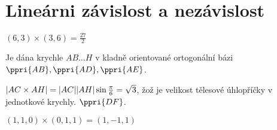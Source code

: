 
\let\braceru=\relax \let\bracelu=\relax 
\def\o#1{\setbox0=
	\hbox{$\kern2pt\overbrace{\kern-2pt#1\kern-2pt}\kern2pt$}\ht0=2.1ex\box0}
\def\to#1{\hbox{#1\rlap{\t{}}}}
\def\rad{\rm{rad}}
\def\f{\frac}
\BeginDoc{}
\section{Lineárni závislost a nezávislost}

$(6,3)\times (3,6) = \f{27}2$


Je dána krychle $AB\dots H$ v kladně orientované ortogonální bázi $\ppri{AB}, \ppri{AD}, \ppri{AE}$.

$|AC\times AH|=|AC|\*|AH|\* \sin \f\pi6 = \sqrt{3}$, žož je velikost tělesové úhlopříčky v jednotkové krychly.
$\ppri{DF}$.

$(1,1,0)\times (0,1,1) = (1,-1,1)$
\EndDoc

